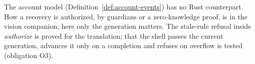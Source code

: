 The account model (Definition~\ref{def:account-events}) has no Rust counterpart.
How a recovery is authorized, by guardians or a zero-knowledge proof, is in
the vision companion; here only the generation matters. The stale-rule refusal
inside \textit{authorize} is proved for the translation; that the shell passes
the current generation, advances it only on a completion and refuses on overflow
is tested (obligation O3).


